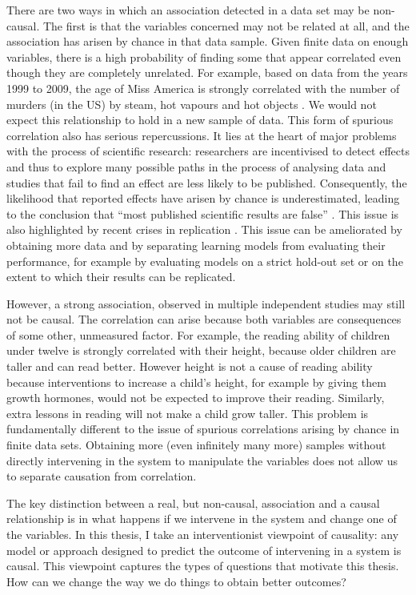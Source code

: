 \documentclass[11pt,a4paper,twoside]{report}
\newcommand{\quotes}[1]{``#1''}
\theoremstyle{plain}
\theoremstyle{definition}
\begin{document}
There are two ways in which an association detected in a data set may be non-causal. The first is that the variables concerned may not be related at all, and the association has arisen by chance in that data sample. Given finite data on enough variables, there is a high probability of finding some that appear correlated even though they are completely unrelated. For example, based on data from the years 1999 to 2009, the age of Miss America is strongly correlated with the number of murders  (in the US) by steam, hot vapours and hot objects \citep{Vigen2015}. We would not expect this relationship to hold in a new sample of data. This form of spurious correlation also has serious repercussions. It lies at the heart of major problems with the process of scientific research: researchers are incentivised to detect effects and thus to explore many possible paths in the process of analysing data and studies that fail to find an effect are less likely to be published. Consequently, the likelihood that reported effects have arisen by chance is underestimated, leading to the conclusion that \quotes{most published scientific results are false} \citep{Ioannidis2005}. This issue is also highlighted by recent crises in replication \citep{OpenScienceCollaboration2015}. This issue can be ameliorated by obtaining more data and by separating learning models from evaluating their performance, for example by evaluating models on a strict hold-out set or on the extent to which their results can be replicated. 

However, a strong association, observed in multiple independent studies may still not be causal. The correlation can arise because both variables are consequences of some other, unmeasured factor. For example, the reading ability of children under twelve is strongly correlated with their height, because older children are taller and can read better. However height is not a cause of reading ability because interventions to increase a child's height, for example by giving them growth hormones, would not be expected to improve their reading. Similarly, extra lessons in reading will not make a child grow taller. This problem is fundamentally different to the issue of spurious correlations arising by chance in finite data sets. Obtaining more (even infinitely many more) samples without directly intervening in the system to manipulate the variables does not allow us to separate causation from correlation. 

The key distinction between a real, but non-causal, association and a causal relationship is in what happens if we intervene in the system and change one of the variables. In this thesis, I take an interventionist viewpoint of causality: any model or approach designed to predict the outcome of intervening in a system is causal. This viewpoint captures the types of questions that motivate this thesis. How can we change the way we do things to obtain better outcomes? 
\end{document}
